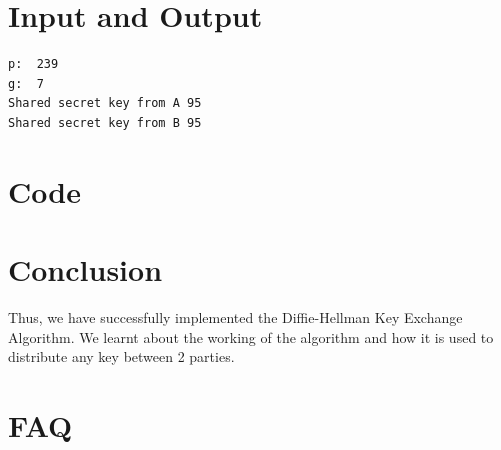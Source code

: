 \documentclass[openany]{book}
\begin{document}
\section{Input and Output}

\begin{verbatim}
p:  239
g:  7
Shared secret key from A 95
Shared secret key from B 95
\end{verbatim}


\section{Code}


\section{Conclusion}
Thus, we have successfully implemented the Diffie-Hellman Key Exchange Algorithm. We learnt about the working of the algorithm and how it is used to distribute any key between 2 parties.
\clearpage

\section{FAQ}
\end{document}
